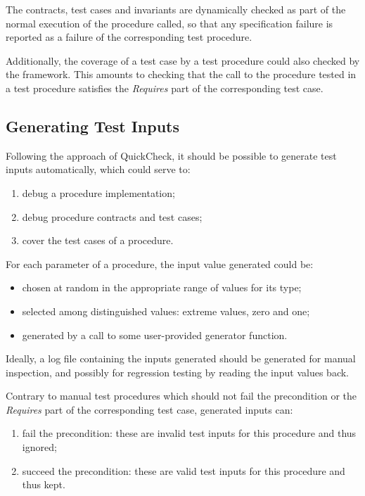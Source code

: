 \documentclass{article}
\begin{document}
The contracts, test cases and invariants are dynamically checked as part of the
normal execution of the procedure called, so that any specification failure is
reported as a failure of the corresponding test procedure.

Additionally, the coverage of a test case by a test procedure could also
checked by the framework. This amounts to checking that the call to the
procedure tested in a test procedure satisfies the \textit{Requires} part of
the corresponding test case.

\subsection{Generating Test Inputs}

Following the approach of QuickCheck, it should be possible to generate test
inputs automatically, which could serve to:
\begin{enumerate}
\item debug a procedure implementation;
\item debug procedure contracts and test cases;
\item cover the test cases of a procedure.
\end{enumerate}

For each parameter of a procedure, the input value generated could be:
\begin{itemize}
\item chosen at random in the appropriate range of values for its type;
\item selected among distinguished values: extreme values, zero and one;
\item generated by a call to some user-provided generator function.
\end{itemize}

Ideally, a log file containing the inputs generated should be generated for
manual inspection, and possibly for regression testing by reading the input
values back.

Contrary to manual test procedures which should not fail the precondition or
the \textit{Requires} part of the corresponding test case, generated inputs
can:
\begin{enumerate}
\item fail the precondition: these are invalid test inputs for this
  procedure and thus ignored;
\item succeed the precondition: these are valid test inputs for this procedure
  and thus kept.
\end{enumerate}
\end{document}
